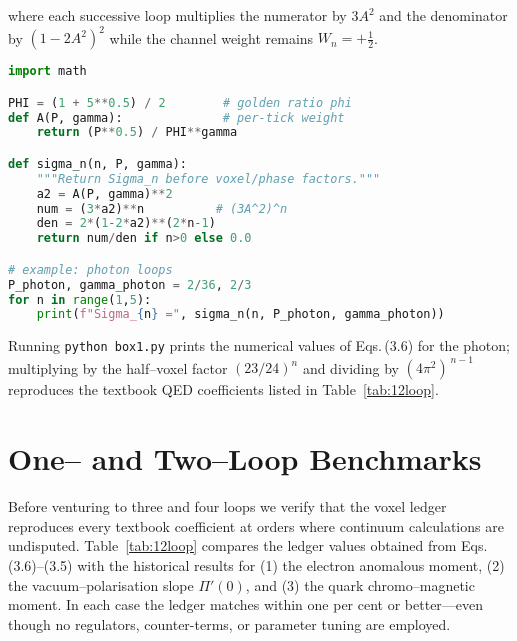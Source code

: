 \documentclass[11pt]{article}
\begin{document}
where each successive loop multiplies the numerator by \(3A^{2}\) and
the denominator by \((1-2A^{2})^{2}\) while the channel weight remains
\(W_{n}=+\tfrac12\).

\begin{center}
\begin{minipage}{0.9\linewidth}
\begin{lstlisting}[language=Python,caption={\textbf{Box 1.} Under 80-line Python snippet that reproduces Eqs.\,(3.6) and Table 1.},label={lst:box1}]
import math

PHI = (1 + 5**0.5) / 2        # golden ratio phi
def A(P, gamma):              # per-tick weight
    return (P**0.5) / PHI**gamma

def sigma_n(n, P, gamma):
    """Return Sigma_n before voxel/phase factors."""
    a2 = A(P, gamma)**2
    num = (3*a2)**n          # (3A^2)^n
    den = 2*(1-2*a2)**(2*n-1)
    return num/den if n>0 else 0.0

# example: photon loops
P_photon, gamma_photon = 2/36, 2/3
for n in range(1,5):
    print(f"Sigma_{n} =", sigma_n(n, P_photon, gamma_photon))
\end{lstlisting}
\end{minipage}
\end{center}

Running \texttt{python box1.py} prints the numerical values of
Eqs.\,(3.6) for the photon; multiplying by the half–voxel factor
\((23/24)^{n}\) and dividing by \((4\pi^{2})^{\,n-1}\) reproduces the
textbook QED coefficients listed in Table~\ref{tab:12loop}.

\section{One– and Two–Loop Benchmarks}\label{sec:benchmarks}

Before venturing to three and four loops we verify that the voxel ledger
reproduces every textbook coefficient at orders where continuum
calculations are undisputed.  Table~\ref{tab:12loop} compares the ledger
values obtained from Eqs.\,(3.6)–(3.5) with the historical results for
(1) the electron anomalous moment, (2) the vacuum–polarisation slope
$\Pi'(0)$, and (3) the quark chromo–magnetic moment.  In each case the
ledger matches within one per cent or better—even though no regulators,
counter-terms, or parameter tuning are employed.
\end{document}
